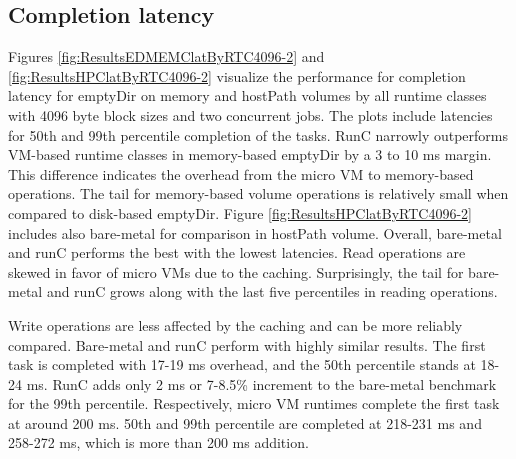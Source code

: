 \subsection{Completion latency}

Figures \ref{fig:ResultsEDMEMClatByRTC4096-2} and \ref{fig:ResultsHPClatByRTC4096-2} visualize the performance for completion latency for emptyDir on memory and hostPath volumes by all runtime classes with 4096 byte block sizes and two concurrent jobs. The plots include latencies for 50th and 99th percentile completion of the tasks. RunC narrowly outperforms VM-based runtime classes in memory-based emptyDir by a 3 to 10 ms margin. This difference indicates the overhead from the micro VM to memory-based operations. The tail for memory-based volume operations is relatively small when compared to disk-based emptyDir. Figure \ref{fig:ResultsHPClatByRTC4096-2} includes also bare-metal for comparison in hostPath volume. Overall, bare-metal and runC performs the best with the lowest latencies. Read operations are skewed in favor of micro VMs due to the caching. Surprisingly, the tail for bare-metal and runC grows along with the last five percentiles in reading operations.

Write operations are less affected by the caching and can be more reliably compared. Bare-metal and runC perform with highly similar results. The first task is completed with 17-19 ms overhead, and the 50th percentile stands at 18-24 ms. RunC adds only 2 ms or 7-8.5\% increment to the bare-metal benchmark for the 99th percentile. Respectively, micro VM runtimes complete the first task at around 200 ms. 50th and 99th percentile are completed at 218-231 ms and 258-272 ms, which is more than 200 ms addition.

